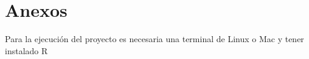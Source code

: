 \section{Anexos}

Para la ejecución del proyecto es necesaria una terminal de Linux o Mac y tener instalado R